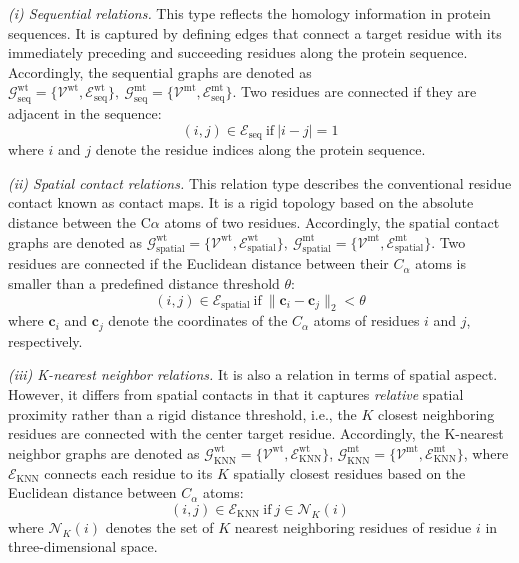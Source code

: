 \documentclass[journal,twoside,web]{ieeecolor}
\begin{document}
\textit{(i) Sequential relations.} This type reflects the homology information in protein sequences. It is captured by defining edges that connect a target residue with its immediately preceding and succeeding residues along the protein sequence. Accordingly, the sequential graphs are denoted as $\mathcal{G}_{\text{seq}}^{\text{wt}} = \{\mathcal{V}^{\text{wt}},\mathcal{E}_{\text{seq}}^{\text{wt}}\},\ \mathcal{G}_{\text{seq}}^{\text{mt}} = \{\mathcal{V}^{\text{mt}},\mathcal{E}_{\text{seq}}^{\text{mt}}\}$. Two residues are connected if they are adjacent in the sequence:
\begin{equation}
(i,j) \in \mathcal{E}_{\text{seq}}\ \text{if}\  \lvert i - j \rvert = 1
\label{eq:seq}
\end{equation}
where $i$ and $j$ denote the residue indices along the protein sequence.

\textit{(ii) Spatial contact relations.} This relation type describes the conventional residue contact known as contact maps. It is a rigid topology based on the absolute distance between the C$\alpha$ atoms of two residues. Accordingly, the spatial contact graphs are denoted as $\mathcal{G}_{\text{spatial}}^{\text{wt}} = \{\mathcal{V}^{\text{wt}},\mathcal{E}_{\text{spatial}}^{\text{wt}}\},\ \mathcal{G}_{\text{spatial}}^{\text{mt}} = \{\mathcal{V}^{\text{mt}},\mathcal{E}_{\text{spatial}}^{\text{mt}}\}$. Two residues are connected if the Euclidean distance between their $C_{\alpha}$ atoms is smaller than a predefined distance threshold $\theta$:
\begin{equation}
(i,j) \in \mathcal{E}_{\text{spatial}}\ \text{if}\ \lVert \bm{c}_{i} - \bm{c}_{j} \rVert_{2} < \theta
\label{eq:spatial}
\end{equation}
where $\bm{c}_{i}$ and $\bm{c}_{j}$ denote the coordinates of the $C_{\alpha}$ atoms of residues $i$ and $j$, respectively.

\textit{(iii) K-nearest neighbor relations.} It is also a relation in terms of spatial aspect. However, it differs from spatial contacts in that it captures \emph{relative} spatial proximity rather than a rigid distance threshold, i.e., the $K$ closest neighboring residues are connected with the center target residue. Accordingly, the K-nearest neighbor graphs are denoted as $\mathcal{G}_{\text{KNN}}^{\text{wt}} = \{\mathcal{V}^{\text{wt}},\mathcal{E}_{\text{KNN}}^{\text{wt}}\}$, $\mathcal{G}_{\text{KNN}}^{\text{mt}} = \{\mathcal{V}^{\text{mt}},\mathcal{E}_{\text{KNN}}^{\text{mt}}\}$, where $\mathcal{E}_{\text{KNN}}$ connects each residue to its $K$ spatially closest residues based on the Euclidean distance between $C_{\alpha}$ atoms:
\begin{equation}
(i,j) \in \mathcal{E}_{\text{KNN}}\ \text{if}\ j \in \mathcal{N}_{K}(i)
\label{eq:knn}
\end{equation}
where $\mathcal{N}_{K}(i)$ denotes the set of $K$ nearest neighboring residues of residue $i$ in three-dimensional space.
\end{document}
